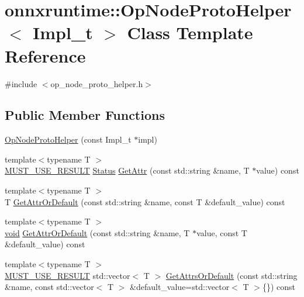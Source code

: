 \hypertarget{classonnxruntime_1_1OpNodeProtoHelper}{}\section{onnxruntime\+:\+:Op\+Node\+Proto\+Helper$<$ Impl\+\_\+t $>$ Class Template Reference}
\label{classonnxruntime_1_1OpNodeProtoHelper}


{\ttfamily \#include $<$op\+\_\+node\+\_\+proto\+\_\+helper.\+h$>$}

\subsection*{Public Member Functions}
\begin{DoxyCompactItemize}
\item 
\mbox{\hyperlink{classonnxruntime_1_1OpNodeProtoHelper_a7ebaae149b91605487008748a1d9bdbf}{Op\+Node\+Proto\+Helper}} (const Impl\+\_\+t $\ast$impl)
\item 
{\footnotesize template$<$typename T $>$ }\\\mbox{\hyperlink{op__node__proto__helper_8h_afefbce768b9d0df9c9ebc30dd6d13fed}{M\+U\+S\+T\+\_\+\+U\+S\+E\+\_\+\+R\+E\+S\+U\+LT}} \mbox{\hyperlink{classonnxruntime_1_1common_1_1Status}{Status}} \mbox{\hyperlink{classonnxruntime_1_1OpNodeProtoHelper_ac1cf3e77a444ae4b2b5ce34a56f5e4c9}{Get\+Attr}} (const std\+::string \&name, T $\ast$value) const
\item 
{\footnotesize template$<$typename T $>$ }\\T \mbox{\hyperlink{classonnxruntime_1_1OpNodeProtoHelper_ad6faae953b43361c87bcc09defb57f18}{Get\+Attr\+Or\+Default}} (const std\+::string \&name, const T \&default\+\_\+value) const
\item 
{\footnotesize template$<$typename T $>$ }\\\mbox{\hyperlink{mlasi_8h_a88f941d423cb2a819b70a1358982b1a6}{void}} \mbox{\hyperlink{classonnxruntime_1_1OpNodeProtoHelper_a29395a652a337744db55dbea2f0551a1}{Get\+Attr\+Or\+Default}} (const std\+::string \&name, T $\ast$value, const T \&default\+\_\+value) const
\item 
{\footnotesize template$<$typename T $>$ }\\\mbox{\hyperlink{op__node__proto__helper_8h_afefbce768b9d0df9c9ebc30dd6d13fed}{M\+U\+S\+T\+\_\+\+U\+S\+E\+\_\+\+R\+E\+S\+U\+LT}} std\+::vector$<$ T $>$ \mbox{\hyperlink{classonnxruntime_1_1OpNodeProtoHelper_a16d14c1bba35f141ab9c9921d9190f6c}{Get\+Attrs\+Or\+Default}} (const std\+::string \&name, const std\+::vector$<$ T $>$ \&default\+\_\+value=std\+::vector$<$ T $>$\{\}) const

\end{DoxyCompactItemize}
